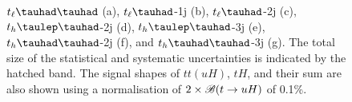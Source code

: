 \begin{figure}[H]
{%
$t_{\ell}\thadhad$ (a),  $t_{\ell}\tauhad$-1j (b),  $t_{\ell}\tauhad$-2j (c), $t_h\tlhad$-2j (d), $t_h\tlhad$-3j (e), $t_h\thadhad$-2j (f), and $t_h\thadhad$-3j (g). 
The total size of the statistical and systematic uncertainties is indicated by the hatched band. The signal shapes of $tt(uH)$, $tH$, and their sum are also shown using a normalisation of $2 \times\mathscr{B}(t\to uH)$ of 0.1\%. 
}
\label{fig:asimov_postfitbdtHu}
\end{figure}



\begin{figure}[H]
\centering
\begin{tabular}{@{}ccc@{}}


\end{tabular}
\end{figure}
